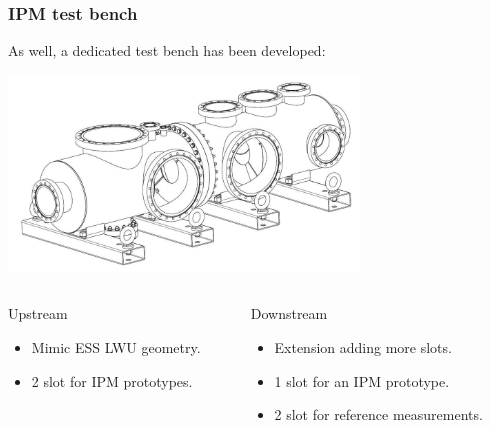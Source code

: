 \begin{frame}
  \frametitle{IPM test bench}
  As well, a dedicated test bench has been developed:
  \begin{center}
    \includegraphics[width=0.7\textwidth]{04_Test/fig/fig000_Testbench.png}
  \end{center}
  \begin{columns}[T]
    \begin{column}{0.45\textwidth}
      \begin{block}{Upstream}
        \begin{itemize}
          \item Mimic ESS LWU geometry.
          \item 2 slot for IPM prototypes.
        \end{itemize}
      \end{block}
    \end{column}

    \begin{column}{0.45\textwidth}
      \begin{block}{Downstream}
        \begin{itemize}
          \item Extension adding more slots.
          \item 1 slot for an IPM prototype.
          \item 2 slot for reference measurements.
        \end{itemize}
      \end{block}
    \end{column}
  \end{columns}

\end{frame}

